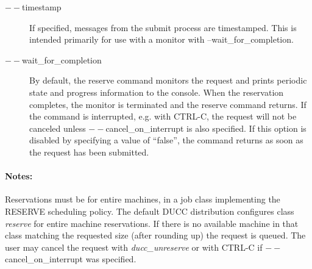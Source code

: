 \begin{description}
           \item[$--$timestamp ]
             If specified, messages from the submit process are timestamped. This is intended primarily 
             for use with a monitor with --wait\_for\_completion. 

           \item[$--$wait\_for\_completion ]             
             By default, the reserve command monitors the request and prints periodic
             state and progress information to the console.  When the reservation completes, the monitor
             is terminated and the reserve command returns.  If the command is interrupted, e.g. with CTRL-C,
             the request will not be canceled unless $--$cancel\_on\_interrupt is also specified.
             If this option is disabled by specifying a value of ``false'', the command returns as
             soon as the request has been submitted.


        \end{description}
            
    \paragraph{Notes:}
    Reservations must be for entire machines, in a job class implementing the RESERVE scheduling
    policy. The default DUCC distribution configures class {\em reserve} for entire machine
    reservations.  If there is no available machine in that class matching the requested size (after
    rounding up) the request is queued.  The user may cancel the request with {\em ducc\_unreserve}
    or with CTRL-C if $--$cancel\_on\_interrupt was specified.
